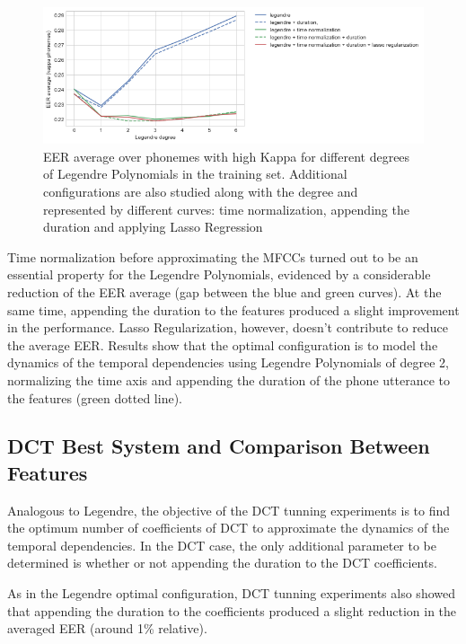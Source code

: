 \begin{figure}[H]
	\centering
	\includegraphics[width=1.0\textwidth]{files/figures/results/legendre-dct/legendre-tunning.png}
	\caption{EER average over phonemes with high Kappa for different
	degrees of Legendre Polynomials in
	the training set. Additional configurations are also studied along with the degree and
	represented by different curves: time normalization, appending the duration and applying
	Lasso Regression}
	\label{fig:legendreTunning}
\end{figure}

Time normalization before approximating the
MFCCs turned out to be an essential property for the Legendre Polynomials, evidenced by a
considerable reduction of the EER average (gap between the blue and green curves). At the same
time, appending the duration to the features produced a slight improvement in the performance.
Lasso Regularization, however, doesn't contribute to reduce the average EER.
Results show that the optimal configuration is to model the dynamics of the temporal dependencies
using Legendre Polynomials of degree 2, normalizing the time axis and appending the duration of the
phone utterance to the features (green dotted line).

\subsection{DCT Best System and Comparison Between Features}

Analogous to Legendre, the objective of the DCT tunning experiments is to find the optimum
number of coefficients of DCT to approximate the dynamics of the temporal dependencies.
In the DCT case, the only additional parameter to be determined is whether or not appending the
duration to the DCT coefficients.

As in the Legendre optimal configuration, DCT tunning experiments also showed that appending the
duration to the coefficients produced a slight reduction in the averaged EER (around 1\%
relative).

